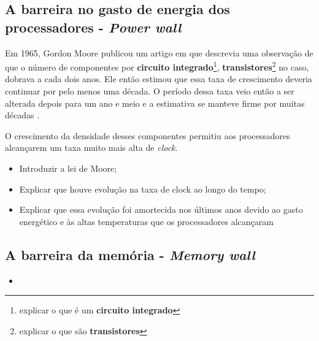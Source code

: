     \subsection{A barreira no gasto de energia dos processadores - \textit{Power wall}}
    
    	Em 1965, Gordon Moore publicou um artigo em que descrevia uma observação de que o
    	número de componentes por \textbf{circuito integrado}\footnote{explicar o que é um 
    	\textbf{circuito integrado}}, \textbf{transistores}\footnote{explicar o que são 
    	\textbf{transistores}} no caso, dobrava a cada dois anos. Ele então estimou que essa 
	    taxa de crescimento deveria continuar por pelo menos uma década. O período dessa 
	    taxa veio então a ser alterada depois para um ano e meio e a estimativa se manteve 
	    firme por muitas décadas \cite{wiki:moorelaw}.
    	
    	O crescimento da densidade desses componentes permitiu aos processadores alcançarem um taxa muito mais alta de \textit{clock}.
    
        \begin{itemize}
            \item Introduzir a lei de Moore;
            \item Explicar que houve evolução na taxa de clock ao longo do tempo;
            \item Explicar que essa evolução foi amortecida nos últimos anos devido 
            ao gasto energético e às altas temperaturas que os processadores alcançaram
        \end{itemize}
    
    \subsection{A barreira da memória - \textit{Memory wall}}
    
	    
	    \begin{itemize}
	    	\item 
	    \end{itemize}
